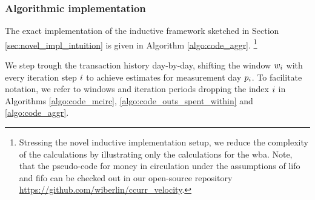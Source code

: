 

\subsubsection{Algorithmic implementation}
\label{sec:novel_impl_algo}%
The exact implementation of the inductive framework sketched in Section \ref{sec:novel_impl_intuition} is given in Algorithm \ref{algo:code_aggr}.%
\footnote{Stressing the novel inductive implementation setup, we reduce the complexity of the calculations by illustrating only the calculations for the \ac{wba}. %
Note, that the pseudo-code for money in circulation under the assumptions of \ac{lifo} and \ac{fifo} can be checked out in our open-source repository \url{https://github.com/wiberlin/ccurr_velocity}.
} %

We step trough the transaction history day-by-day, shifting the window \({w}_{{i}}\) with every iteration step \({i}\) to achieve estimates for measurement day \({p}_{{i}}\). %
To facilitate notation, we refer to windows and iteration periods dropping the index \({i}\) in Algorithms \ref{algo:code_mcirc}, \ref{algo:code_outs_spent_within} and \ref{algo:code_aggr}. %

